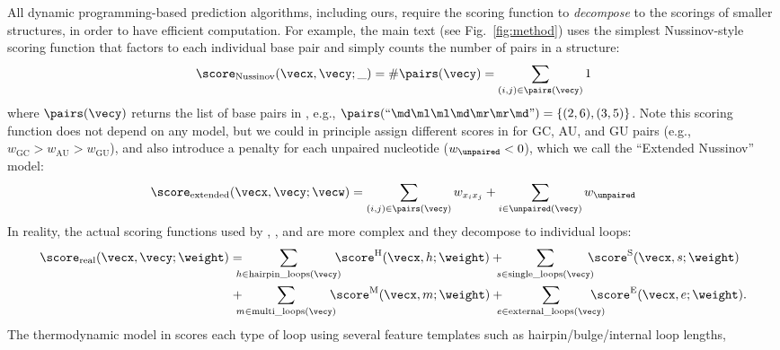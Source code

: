 All dynamic programming-based prediction algorithms, including ours, %
require the scoring function to {\em decompose} to the scorings of smaller structures,
in order to have efficient computation.
For example, the main text (see Fig.~\ref{fig:method}) uses the simplest Nussinov-style scoring function 
that factors to each individual base pair and simply counts the number of pairs in a structure:
\begin{equation}
  \score_{\text{Nussinov}}(\vecx, \vecy; \_) = \# \pairs(\vecy) = \sum_{(i,j)\in \pairs (\vecy)} 1
  \label{eq:nussinov}
\end{equation}
where $\pairs(\vecy)$ returns the list of base pairs in \vecy, e.g.,
$\pairs(\text{``\md\ml\ml\md\mr\mr\md''}) = \{(2,6), (3,5)\}$.
Note this scoring function does not depend on any model,
but we could in principle assign different scores in \vecw for GC, AU, and GU pairs (e.g., $w_\text{GC} > w_\text{AU} > w_\text{GU}$),
and also introduce a penalty for each unpaired nucleotide ($w_\unpaired < 0$),
which we call the ``Extended Nussinov'' model:
\begin{equation}
  \score_{\text{extended}}(\vecx, \vecy; \vecw) = \sum_{(i,j)\in \pairs (\vecy)} w_{x_i x_j} +\sum_{i\in \unpaired(\vecy)} w_\unpaired
  \label{eq:extended}
\end{equation}
In reality, the actual scoring functions %
used by \contrafold, \rnafold, and \linearfold are more complex and they
decompose to individual loops: %
\begin{equation}
  \begin{split}
 \score_\text{real}(\vecx, \vecy; \weight) = &
 \!\!\!\!\sum_{h \in \text{hairpin\_loops}(\vecy)}\!\!\!\! \score^{\mathrm H}(\vecx, h; \weight)  + \!\!\!\!\sum_{s \in \text{single\_loops}(\vecy)}\!\!\!\! \score^{\mathrm S}(\vecx, s; \weight) \\
 + & \!\!\!\!\sum_{m \in \text{multi\_loops}(\vecy)}\!\!\!\! \score^{\mathrm M}(\vecx, m; \weight) +  \!\!\!\!\sum_{e \in \text{external\_loops}(\vecy)}\!\!\!\!\!\!\!\! \score^{\mathrm E}(\vecx, e; \weight).
\end{split}
\label{eq:decomp}
\end{equation}
The thermodynamic %
model in \viennarna scores %
each type of loop %
using several feature templates such as
hairpin/bulge/internal loop lengths,
